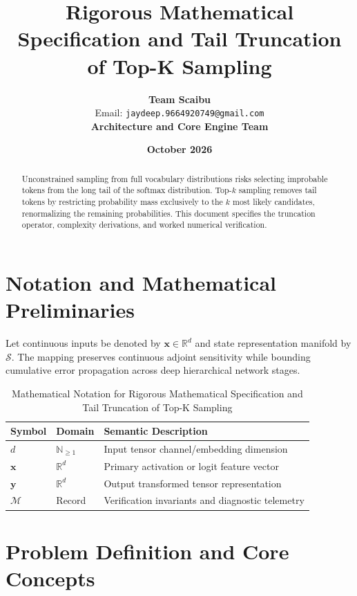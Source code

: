 \documentclass[11pt,a4paper]{article}
\title{\textbf{Rigorous Mathematical Specification and Tail Truncation of Top-K Sampling}}
\author{\textbf{Team Scaibu} \\ \small Email: \texttt{jaydeep.9664920749@gmail.com} \\ \small \textbf{Architecture and Core Engine Team}}
\date{\textbf{October 2026}}
\theoremstyle{definition}
\begin{document}
\maketitle

\begin{abstract}
Unconstrained sampling from full vocabulary distributions risks selecting improbable tokens from the long tail of the softmax distribution. Top-$k$ sampling removes tail tokens by restricting probability mass exclusively to the $k$ most likely candidates, renormalizing the remaining probabilities. This document specifies the truncation operator, complexity derivations, and worked numerical verification.
\end{abstract}

\section{Notation and Mathematical Preliminaries}

Let continuous inputs be denoted by $\mathbf{x} \in \mathbb{R}^d$ and state representation manifold by $\mathcal{S}$. The mapping preserves continuous adjoint sensitivity while bounding cumulative error propagation across deep hierarchical network stages.

\begin{table}[h]
\centering
\caption{Mathematical Notation for Rigorous Mathematical Specification and Tail Truncation of Top-K Sampling}
\begin{tabular}{lll}
\toprule
\textbf{Symbol} & \textbf{Domain} & \textbf{Semantic Description} \\
\midrule
$d$ & $\mathbb{N}_{\ge 1}$ & Input tensor channel/embedding dimension \\
$\mathbf{x}$ & $\mathbb{R}^d$ & Primary activation or logit feature vector \\
$\mathbf{y}$ & $\mathbb{R}^d$ & Output transformed tensor representation \\
$\mathcal{M}$ & Record & Verification invariants and diagnostic telemetry \\
\bottomrule
\end{tabular}
\end{table}

\section{Problem Definition and Core Concepts}
\end{document}
